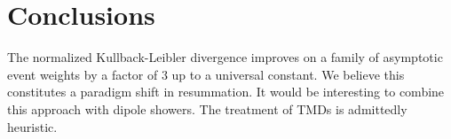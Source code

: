 \section{Conclusions}\label{sec:conclusions}

The normalized Kullback-Leibler divergence improves on a family of
asymptotic event weights by a factor of 3 up to a universal constant. We
believe this constitutes a paradigm shift in resummation. It would be
interesting to combine this approach with dipole showers. The treatment
of TMDs is admittedly heuristic.

